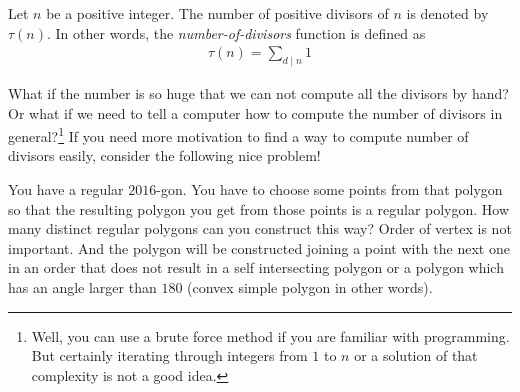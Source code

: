 		\begin{definition}
			Let $n$ be a positive integer. The number of positive divisors of $n$ is denoted by $\tau(n)$. In other words, the \textit{number-of-divisors} function is defined as
				\begin{align*}
					\tau(n)=\sum_{d\mid n} 1
				\end{align*}
		\end{definition}
	What if the number is so huge that we can not compute all the divisors by hand? Or what if we need to tell a computer how to compute the number of divisors in general?\footnote{Well, you can use a brute force method if you are familiar with programming. But certainly iterating through integers from $1$ to $n$ or a solution of that complexity is not a good idea.} If you need more motivation to find a way to compute number of divisors easily, consider the following nice problem!
		\begin{problem}
			You have a regular $2016$-gon. You have to choose some points from that polygon so that the resulting polygon you get from those points is a regular polygon. How many distinct regular polygons can you construct this way? Order of vertex is not important. And the polygon will be constructed joining a point with the next one in an order that does not result in a self intersecting polygon or a polygon which has an angle larger than $180$ (convex simple polygon in other words).
		\end{problem}


